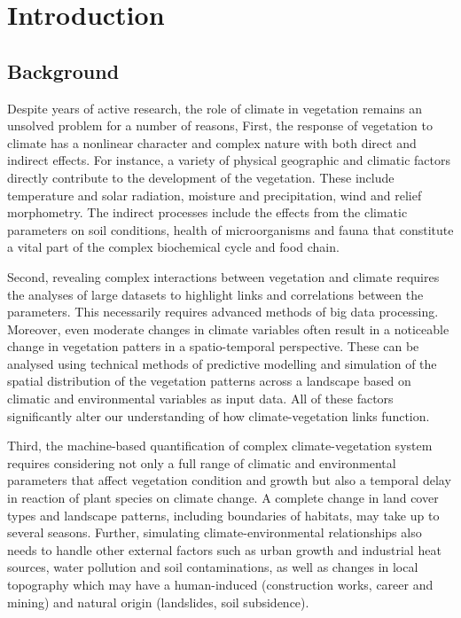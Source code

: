 \documentclass[atmosphere,article,submit,pdftex,moreauthors]{Definitions/mdpi}
\begin{document}
\section{Introduction}

\subsection{Background}
Despite years of active research, the role of climate in vegetation remains an unsolved problem for a number of reasons, First, the response of vegetation to climate has a nonlinear character and complex nature with both direct and indirect effects. For instance, a variety of physical geographic and climatic factors directly contribute to the development of the vegetation. These include temperature and solar radiation, moisture and precipitation, wind and relief morphometry. The indirect processes include the effects from the climatic parameters on soil conditions, health of microorganisms and fauna that constitute a vital part of the complex biochemical cycle and food chain. 

Second, revealing complex interactions between vegetation and climate requires the analyses of large datasets to highlight links and correlations between the parameters. This necessarily requires advanced methods of big data processing. Moreover, even moderate changes in climate variables  often result in a noticeable change in vegetation patters in a spatio-temporal perspective. These can be analysed using technical methods of predictive modelling and simulation of the spatial distribution of the vegetation patterns across a landscape based on climatic and environmental variables as input data. All of these factors significantly alter our understanding of how climate-vegetation links function.

Third, the machine-based quantification of complex climate-vegetation system requires considering not only a full range of climatic and environmental parameters that affect vegetation condition and growth but also a temporal delay in reaction of plant species on climate change. A complete change in land cover types and landscape patterns, including boundaries of habitats, may take up to several seasons. Further, simulating climate-environmental relationships also needs to handle other external factors such as urban growth and industrial heat sources, water pollution and soil contaminations, as well as changes in local topography which may have a human-induced (construction works, career and mining) and natural origin (landslides, soil subsidence).
\end{document}
